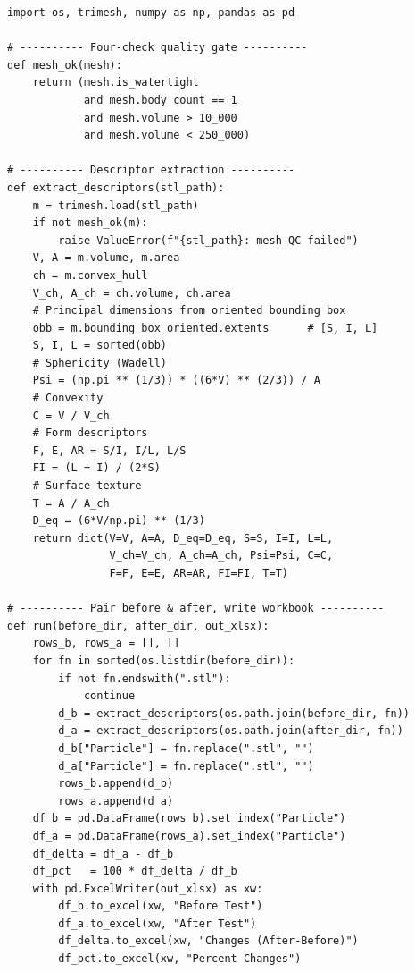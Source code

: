 \begin{lstlisting}[style=python,caption={Core of the morphological-analysis pipeline (abridged).},label={lst:analyzer}]
import os, trimesh, numpy as np, pandas as pd

# ---------- Four-check quality gate ----------
def mesh_ok(mesh):
    return (mesh.is_watertight
            and mesh.body_count == 1
            and mesh.volume > 10_000
            and mesh.volume < 250_000)

# ---------- Descriptor extraction ----------
def extract_descriptors(stl_path):
    m = trimesh.load(stl_path)
    if not mesh_ok(m):
        raise ValueError(f"{stl_path}: mesh QC failed")
    V, A = m.volume, m.area
    ch = m.convex_hull
    V_ch, A_ch = ch.volume, ch.area
    # Principal dimensions from oriented bounding box
    obb = m.bounding_box_oriented.extents      # [S, I, L]
    S, I, L = sorted(obb)
    # Sphericity (Wadell)
    Psi = (np.pi ** (1/3)) * ((6*V) ** (2/3)) / A
    # Convexity
    C = V / V_ch
    # Form descriptors
    F, E, AR = S/I, I/L, L/S
    FI = (L + I) / (2*S)
    # Surface texture
    T = A / A_ch
    D_eq = (6*V/np.pi) ** (1/3)
    return dict(V=V, A=A, D_eq=D_eq, S=S, I=I, L=L,
                V_ch=V_ch, A_ch=A_ch, Psi=Psi, C=C,
                F=F, E=E, AR=AR, FI=FI, T=T)

# ---------- Pair before & after, write workbook ----------
def run(before_dir, after_dir, out_xlsx):
    rows_b, rows_a = [], []
    for fn in sorted(os.listdir(before_dir)):
        if not fn.endswith(".stl"):
            continue
        d_b = extract_descriptors(os.path.join(before_dir, fn))
        d_a = extract_descriptors(os.path.join(after_dir, fn))
        d_b["Particle"] = fn.replace(".stl", "")
        d_a["Particle"] = fn.replace(".stl", "")
        rows_b.append(d_b)
        rows_a.append(d_a)
    df_b = pd.DataFrame(rows_b).set_index("Particle")
    df_a = pd.DataFrame(rows_a).set_index("Particle")
    df_delta = df_a - df_b
    df_pct   = 100 * df_delta / df_b
    with pd.ExcelWriter(out_xlsx) as xw:
        df_b.to_excel(xw, "Before Test")
        df_a.to_excel(xw, "After Test")
        df_delta.to_excel(xw, "Changes (After-Before)")
        df_pct.to_excel(xw, "Percent Changes")
\end{lstlisting}
